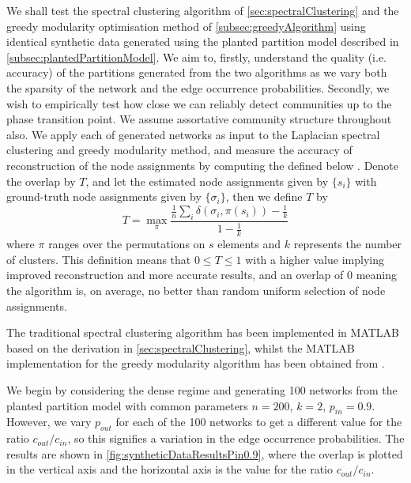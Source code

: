 We shall test the spectral clustering algorithm of \cref{sec:spectralClustering} and the greedy modularity optimisation method of \cref{subsec:greedyAlgorithm} using identical synthetic data generated using the planted partition model described in \cref{subsec:plantedPartitionModel}.
We aim to, firstly, understand the quality (i.e. accuracy) of the partitions generated from the two algorithms as we vary both the sparsity of the network and the edge occurrence probabilities.
Secondly, we wish to empirically test how close we can reliably detect communities up to the phase transition point.
We assume assortative community structure throughout also.
We apply each of generated networks as input to the Laplacian spectral clustering and greedy modularity method, and measure the accuracy of reconstruction of the node assignments by computing the  defined below \cite{DKM+11}.
Denote the overlap by $T$, and let the estimated node assignments given by $\{s_{i}\}$ with ground-truth node assignments given by $\{\sigma_{i}\}$, then we define $T$ by
\begin{equation}
	\label{eq:overlap}
	T = \max_{\pi} \frac{\frac{1}{n} \sum_{i} \delta(\sigma_{i},\pi(s_{i})) - \frac{1}{k}}{1 - \frac{1}{k}}
\end{equation}
where $\pi$ ranges over the permutations on $s$ elements and $k$ represents the number of clusters.
This definition means that $0 \le T \le 1$ with a higher value implying improved reconstruction and more accurate results, and an overlap of 0 meaning the algorithm is, on average, no better than random uniform selection of node assignments.

The traditional spectral clustering algorithm  has been implemented in MATLAB based on the derivation in \cref{sec:spectralClustering}, whilst the MATLAB implementation for the greedy modularity algorithm has been obtained from \cite{ELM}.

We begin by considering the dense regime and generating 100 networks from the planted partition model with common parameters $n=200$, $k=2$, $p_{in}=0.9$.
However, we vary $p_{out}$ for each of the 100 networks to get a different value for the ratio $c_{out}/c_{in}$, so this signifies a variation in the edge occurrence probabilities.
The results are shown in \cref{fig:syntheticDataResultsPin0.9}, where the overlap is plotted in the vertical axis and the horizontal axis is the value for the ratio $c_{out}/c_{in}$.

